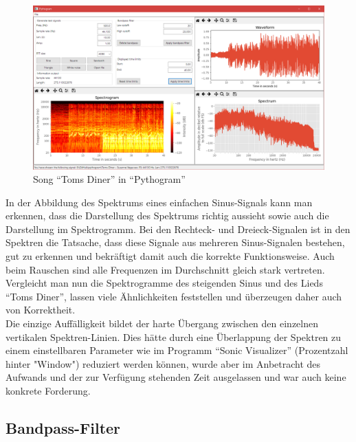 \documentclass[a4paper]{article}
\begin{document}
\begin{figure}[H]
    \centering
    \begin{minipage}{1.0\textwidth}
        \centering
        \includegraphics[width=1.0\textwidth]{Toms_Diner.png}
        \caption{Song "`Toms Diner"' in "`Pythogram"'}
    \end{minipage}
\end{figure}

\noindent
In der Abbildung des Spektrums eines einfachen Sinus-Signals kann man erkennen, dass die Darstellung des Spektrums richtig aussieht sowie auch die Darstellung im Spektrogramm. Bei den Rechteck- und Dreieck-Signalen ist in den Spektren die Tatsache, dass diese Signale aus mehreren Sinus-Signalen bestehen, gut zu erkennen und bekräftigt damit auch die korrekte Funktionsweise. Auch beim Rauschen sind alle Frequenzen im Durchschnitt gleich stark vertreten.\\
Vergleicht man nun die Spektrogramme des steigenden Sinus und des Lieds "`Toms Diner"', lassen viele Ähnlichkeiten feststellen und überzeugen daher auch von Korrektheit.\vspace{1em}\\
Die einzige Auffälligkeit bildet der harte Übergang zwischen den einzelnen vertikalen Spektren-Linien. Dies hätte durch eine Überlappung der Spektren zu einem einstellbaren Parameter wie im Programm "`Sonic Visualizer"' (Prozentzahl hinter "Window") reduziert werden können, wurde aber im Anbetracht des Aufwands und der zur Verfügung stehenden Zeit ausgelassen und war auch keine konkrete Forderung.

\subsection{Bandpass-Filter}
\end{document}
